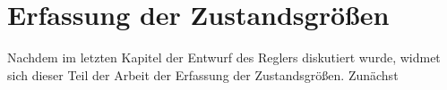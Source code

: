 \ifx\FORMAT\undefined


\fi

\chapter{Erfassung der Zustandsgrößen}
Nachdem im letzten Kapitel der Entwurf des Reglers diskutiert wurde, widmet sich dieser Teil der Arbeit der Erfassung der Zustandsgrößen. Zunächst 
\newpage

\newpage

\newpage

\newpage



\ifx\FORMAT\undefined

\fi
